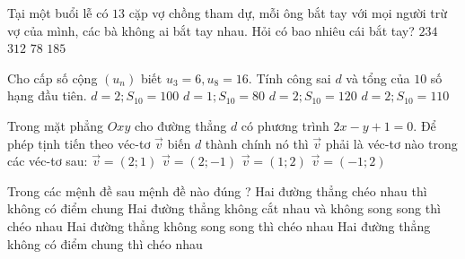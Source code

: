 \begin{ex}%
Tại một buổi lễ có $13$ cặp vợ chồng tham dự, mỗi ông bắt tay với mọi người trừ vợ của mình, các bà không ai bắt tay nhau. Hỏi có bao nhiêu cái bắt tay?
\choice
{\True $234$}
{$312$}
{$78$}
{$185$}
\end{ex}

\begin{ex}%
Cho cấp số cộng $(u_n)$ biết $u_3=6, u_8=16.$ Tính công sai $d$ và tổng của $10$ số hạng đầu tiên.
\choice
{$d=2; S_{10}=100$}
{$d=1; S_{10}=80$}
{$d=2; S_{10}=120$}
{\True $d=2; S_{10}=110$}
\end{ex}

\begin{ex}%
Trong mặt phẳng $Oxy$ cho đường thẳng $d$ có phương trình $2x-y+1=0.$ Để phép tịnh tiến theo véc-tơ $\vec{v}$ biến $d$ thành chính nó thì $\vec{v}$ phải là véc-tơ nào trong các véc-tơ sau:
\choice
{$\vec{v}=(2;1)$}
{$\vec{v}=(2;-1)$}
{\True $\vec{v}=(1;2)$}
{$\vec{v}=(-1;2)$}
\end{ex}

\begin{ex}%
Trong các mệnh đề sau mệnh đề nào đúng ?
\choice
{\True Hai đường thẳng chéo nhau thì không có điểm chung}
{Hai đường thẳng không cắt nhau và không song song thì chéo nhau}
{Hai đường thẳng không song song thì chéo nhau}
{Hai đường thẳng không có điểm chung thì chéo nhau}
\end{ex}

